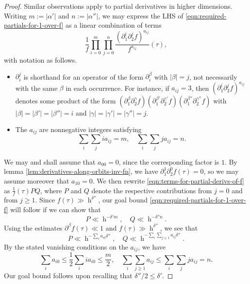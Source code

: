 \documentclass[reqno]{amsart}
\DeclareMathOperator{\h}{h}
\theoremstyle{plain} \newtheorem{theorem} {Theorem}
\theoremstyle{definition} \newtheorem{definition} [theorem] {Definition}
\theoremstyle{itplain} %
\numberwithin{equation}{section}
\numberwithin{theorem}{section}
\renewcommand{\geq}{\geqslant}
\renewcommand{\leq}{\leqslant}
\begin{document}
\begin{proof}
  Similar observations apply to partial derivatives in higher dimensions.  Writing $m := |\alpha '|$ and $n := |\alpha ''|$, we may express the LHS of \eqref{eqn:required-partials-for-1-over-f} as
  a linear combination of terms
  \begin{equation}\label{eqn:terms-for-partial-derivs-of-f}
    \frac{1}{f}
    \prod_{i=0}^{m}
    \prod_{j=0}^{n}
    \frac{
      (\partial_1^i \partial_2^j f)^{a_{i j}}
    }{f^{a_{i j}}}
    (\tau),
  \end{equation}
  with notation as follows.
  \begin{itemize}
  \item $\partial_i^j$ is shorthand for an operator of the form $\partial_i^{\beta}$ with $|\beta| = j$, not necessarily with the same $\beta$ in each occurrence.  For instance, if $a_{ij } = 3$, then $(\partial_1^i \partial_2^j f)^{a_{i j}}$ denotes some product of the form $(\partial_1^{\beta} \partial_2^{\gamma } f) (\partial_1^{\beta'} \partial_2^{\gamma'} f) (\partial_1^{\beta''} \partial_2^{\gamma'' } f)$ with $|\beta| = |\beta '| = |\beta ''| = i$ and $|\gamma| = |\gamma '| = |\gamma ''| = j$.
  \item The $a_{i j}$ are nonnegative integers satisfying
    \[
      \sum_{i} \sum_j i a_{i j} = m, \quad \sum_{i} \sum_j j a_{i j} = n.
    \]
  \end{itemize}
  We may and shall assume that $a_{0 0} = 0$, since the corresponding factor is $1$.  By lemma \ref{lem:derivatives-along-orbits-inv-fn}, we have $\partial_1^1 \partial_2^0 f (\tau) = 0$, so we may assume moreover that $a_{1 0} = 0$.  We then rewrite \eqref{eqn:terms-for-partial-derivs-of-f} as $\frac{1}{f}(\tau) P Q$, where $P$ and $Q$ denote the respective contributions from $j = 0$ and from $j \geq 1$.  Since $f(\tau) \gg \h^{\delta ''}$, our goal bound \eqref{eqn:required-partials-for-1-over-f} will follow if we can show that
  \[
    P \ll \h^{- \delta ' m}, \quad Q \ll \h^{ - \delta '' n}.
  \]
  Using the estimates $\partial^\beta f(\tau) \ll 1$ and $f(\tau) \gg \h^{\delta ''}$, we see that
  \[
    P \ll \h^{- \sum_i a_{i 0} \delta ''}, \quad Q \ll \h^{- \sum_i \sum_{j \geq 1} a_{i j} \delta ''}.
  \]
  By the stated vanishing conditions on the $a_{i j}$, we have
  \[
    \sum_i a_{i 0} \leq \frac{1}{2} \sum_i i a_{i 0} \leq \frac{m}{2}, \quad \sum_i \sum_{j \geq 1} a_{i j} \leq \sum_i \sum_j j a_{i j} = n.
  \]
  Our goal bound follows upon recalling that $\delta ''/2 \leq \delta '$.
\end{proof}
\end{document}
